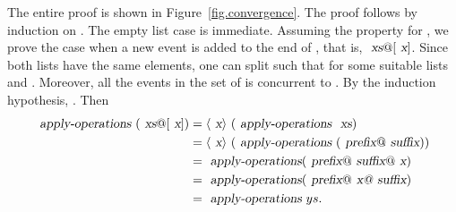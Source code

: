 \documentclass[acmlarge,review,anonymous]{acmart}\settopmatter{printfolios=true}
\begin{document}
The entire proof is shown in Figure~\ref{fig.convergence}.  The proof follows
by induction on . The empty list case is immediate. Assuming the
property for , we prove the case when a new event  is added to
the end of , that is, $\isa{xs}@[\isa{x}]$. Since both lists have the
same elements, one can split  such that  for
some suitable lists  and . Moreover, all the events in
the set of  is concurrent to . By the induction hypothesis,
. Then
\begin{align*}
  \isa{apply-operations}\ (\isa{xs}@[\isa{x}])
  &= \langle\isa{x}\rangle\ (\isa{apply-operations}\ \isa{xs}) \\
  &= \langle\isa{x}\rangle\ (\isa{apply-operations}\ (\isa{prefix}@\isa{suffix}))\\
  &= \isa{apply-operations} (\isa{prefix}@\isa{suffix}@\isa{x}) \\
  &= \isa{apply-operations} (\isa{prefix}@\isa{x@\isa{suffix}}) \\
  &= \isa{apply-operations}\ ys.
\end{align*}
\end{document}
